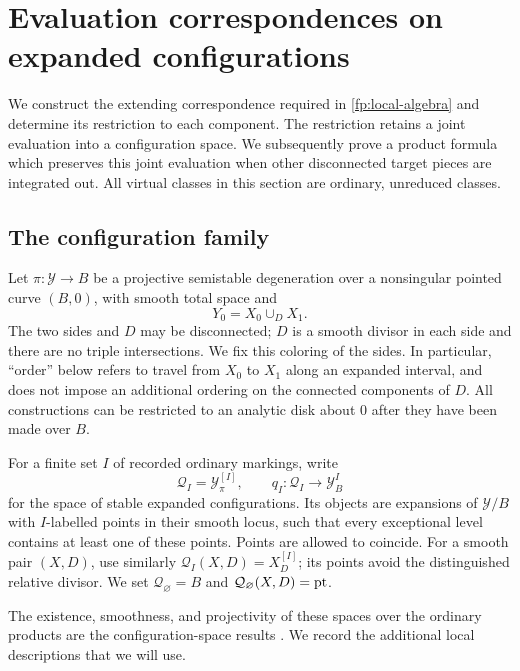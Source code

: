 \section{Evaluation correspondences on expanded configurations}
\label{ev:section}

We construct the extending correspondence required in
\cref{fp:local-algebra} and determine its restriction to each component.
The restriction retains a joint evaluation into a configuration space.
We subsequently prove a product formula which preserves this joint
evaluation when other disconnected target pieces are integrated out.
All virtual classes in this section are ordinary, unreduced classes.

\subsection{The configuration family}

Let $\pi:\mathcal Y\to B$ be a projective semistable degeneration over
a nonsingular pointed curve $(B,0)$, with smooth total space and
\[
  Y_0=X_0\cup_D X_1.
\]
The two sides and $D$ may be disconnected; $D$ is a smooth divisor in
each side and there are no triple intersections.  We fix this coloring
of the sides.  In particular, ``order'' below refers to travel from
$X_0$ to $X_1$ along an expanded interval, and does not impose an
additional ordering on the connected components of $D$.
All constructions can be restricted to an analytic disk about $0$
after they have been made over $B$.

For a finite set $I$ of recorded ordinary markings, write
\[
  \mathcal Q_I=\mathcal Y^{[I]}_\pi,
  \qquad q_I:\mathcal Q_I\longrightarrow\mathcal Y^I_B
\]
for the space of stable expanded configurations.  Its objects are
expansions of $\mathcal Y/B$ with $I$-labelled points in their smooth
locus, such that every exceptional level contains at least one of
these points.  Points are allowed to coincide.  For a smooth pair
$(X,D)$, use similarly $\mathcal Q_I(X,D)=X_D^{[I]}$; its points avoid
the distinguished relative divisor.  We set
$\mathcal Q_\varnothing=B$ and
$\mathcal Q_\varnothing(X,D)=\mathrm{pt}$.

The existence, smoothness, and projectivity of these spaces over the
ordinary products are the configuration-space results
\cite[Propositions 1.2.5 and 1.5.4]{AFConfigurations}.
We record the additional local descriptions that we will use.


